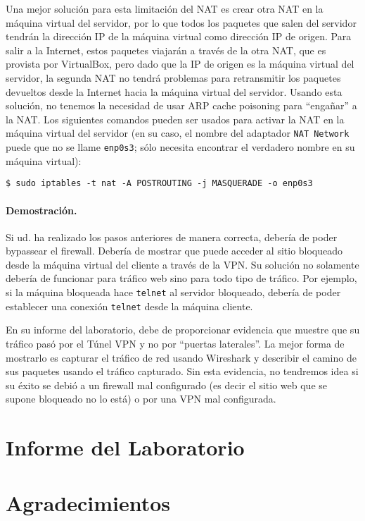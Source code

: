 Una mejor solución para esta limitación del NAT es crear otra NAT en la máquina virtual del servidor, por lo que todos los paquetes que salen del servidor tendrán la dirección IP de la máquina virtual como dirección IP de origen.
Para salir a la Internet, estos paquetes viajarán a través de la otra NAT, que es provista por VirtualBox, pero dado que la IP de origen es la máquina virtual del servidor, la segunda NAT no tendrá problemas para retransmitir los paquetes devueltos desde la Internet hacia la máquina virtual del servidor. Usando esta solución, no tenemos la necesidad de usar ARP cache poisoning para ``engañar'' a la NAT. Los siguientes comandos pueden ser usados para activar la NAT en la máquina virtual del servidor (en su caso, el nombre del adaptador \texttt{NAT Network} puede que no se llame \texttt{enp0s3}; sólo necesita encontrar el verdadero nombre en su máquina virtual):

    
\begin{lstlisting}
$ sudo iptables -t nat -A POSTROUTING -j MASQUERADE -o enp0s3
\end{lstlisting}
    

\paragraph{Demostración.}
Si ud. ha realizado los pasos anteriores de manera correcta, debería de poder bypassear el firewall. Debería de mostrar que puede acceder al sitio bloqueado desde la máquina virtual del cliente a través de la VPN. Su solución no solamente debería de funcionar para tráfico web sino para todo tipo de tráfico. Por ejemplo, si la máquina bloqueada hace \texttt{telnet} al servidor bloqueado, debería de poder establecer una conexión \texttt{telnet} desde la máquina cliente.

En su informe del laboratorio, debe de proporcionar evidencia que muestre que su tráfico pasó por el Túnel VPN y no por ``puertas laterales''. La mejor forma de mostrarlo es capturar el tráfico de red usando Wireshark y describir el camino de sus paquetes usando el tráfico capturado. Sin esta evidencia, no tendremos idea si su éxito se debió a un firewall mal configurado (es decir el sitio web que se supone bloqueado no lo está) o por una VPN mal configurada.

\section{Informe del Laboratorio}



\section*{Agradecimientos}






